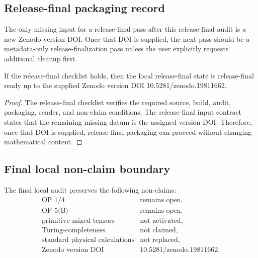 \subsection{Release-final packaging record}
\label{subsec:v4016-release-final-pass-input-contract}

\begin{definition}
\label{def:v4016-release-final-pass-input-contract}
The only missing input for a release-final pass after this release-final audit is a new
Zenodo version DOI. Once that DOI is supplied, the next pass should be a
metadata-only release-finalization pass unless the user explicitly requests
additional cleanup first.
\end{definition}

\begin{proposition}
\label{prop:v4016-single-input-release-final-readiness}
If the release-final checklist holds, then the local release-final state is release-final ready
up to the supplied Zenodo version DOI 10.5281/zenodo.19811662.
\end{proposition}

\begin{proof}
The release-final checklist verifies the required source, build, audit, packaging,
render, and non-claim conditions. The release-final input contract states that
the remaining missing datum is the assigned version DOI. Therefore, once that DOI
is supplied, release-final packaging can proceed without changing mathematical
content.
\end{proof}

\subsection{Final local non-claim boundary}
\label{subsec:v4016-final-local-non-claim-boundary}

\begin{definition}
\label{def:v4016-final-local-non-claim-boundary}
The final local audit preserves the following non-claims:
\[
\begin{array}{ll}
\text{OP~1/4} & \text{remains open},\\
\text{OP~5(B)} & \text{remains open},\\
\text{primitive mixed tensors} & \text{not activated},\\
\text{Turing-completeness} & \text{not claimed},\\
\text{standard physical calculations} & \text{not replaced},\\
\text{Zenodo version DOI} & \text{10.5281/zenodo.19811662}.
\end{array}
\]
\end{definition}

